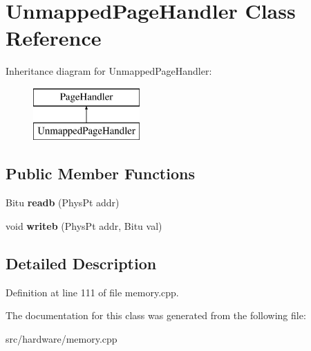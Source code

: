 \hypertarget{classUnmappedPageHandler}{\section{Unmapped\-Page\-Handler Class Reference}
\label{classUnmappedPageHandler}
}
Inheritance diagram for Unmapped\-Page\-Handler\-:\begin{figure}[H]
\begin{center}
\leavevmode
\includegraphics[height=2.000000cm]{classUnmappedPageHandler}
\end{center}
\end{figure}
\subsection*{Public Member Functions}
\begin{DoxyCompactItemize}
\item 
\hypertarget{classUnmappedPageHandler_ae907b93df3e6a3de14944c0226017e03}{Bitu {\bfseries readb} (Phys\-Pt addr)}\label{classUnmappedPageHandler_ae907b93df3e6a3de14944c0226017e03}

\item 
\hypertarget{classUnmappedPageHandler_a9158fb668304825dc4f78adb47666a74}{void {\bfseries writeb} (Phys\-Pt addr, Bitu val)}\label{classUnmappedPageHandler_a9158fb668304825dc4f78adb47666a74}

\end{DoxyCompactItemize}


\subsection{Detailed Description}


Definition at line 111 of file memory.\-cpp.



The documentation for this class was generated from the following file\-:\begin{DoxyCompactItemize}
\item 
src/hardware/memory.\-cpp\end{DoxyCompactItemize}
